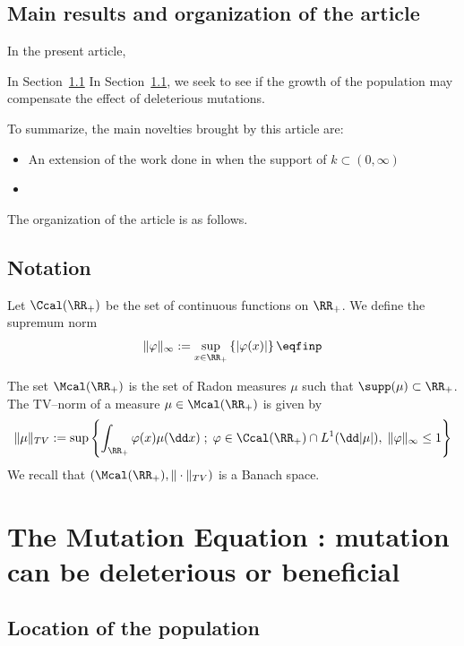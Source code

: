 \subsection{Main results and organization of the article} In the present article, 

In Section~\ref{}
In Section~\ref{}, we seek to see if the growth of the population may compensate the effect of deleterious mutations. 

To summarize, the main novelties brought by this article are: 
\begin{itemize}
    \item An extension of the work done in \cite{doumic2016time} when the support of $k \subset (0, \infty)$
    \item 
\end{itemize}

The organization of the article is as follows.

\subsection{Notation}

Let $\Ccal(\RR_+)$ be the set of continuous functions on $\RR_+$. We define the supremum norm
\begin{equation*}
    \|\varphi\|_{\infty} :=\sup_{x \in \RR_+} \left\{ |\varphi(x)| \right\}
    \eqfinp
\end{equation*}

The set $\Mcal(\RR_+)$ is the set of Radon measures $\mu$ such that $\supp(\mu) \subset \RR_+$. The TV--norm of a measure $\mu \in \Mcal(\RR_+)$ is given by 
    \begin{equation*}
        \|\mu\|_{TV} :=\sup \left\{ \int_{\RR_+} \varphi(x) \mu(\dd x)\; ; \; \varphi \in \Ccal(\RR_+)\cap L^1(\dd|\mu|),\; \|\varphi\|_{\infty} \leq 1\right\}
    \end{equation*}
We recall that $\left(\Mcal(\RR_+), \|\cdot\|_{TV}\right)$ is a Banach space. 


\section{The Mutation Equation : mutation can be deleterious or beneficial}

\subsection{Location of the population}

